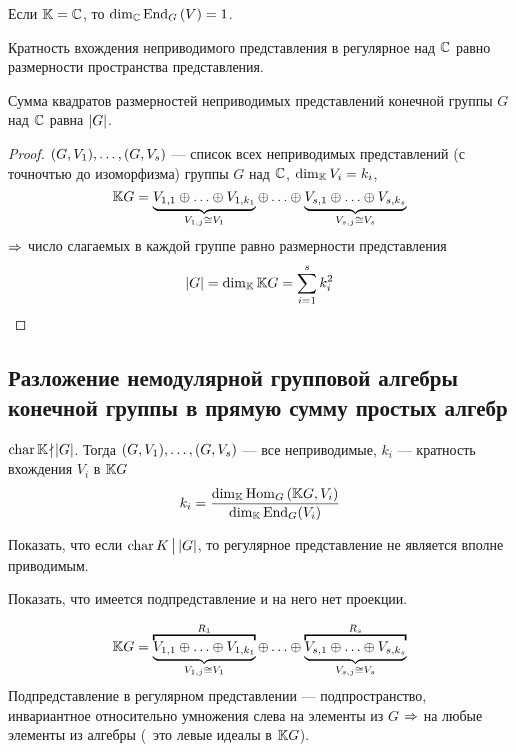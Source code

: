 Если $\mathbb{K} = \mathbb{C}$, то $\dim_{\mathbb{C}} \operatorname{End}_{G} \left(V\right) = 1$.
\begin{stm}
	Кратность вхождения неприводимого представления в регулярное над $\mathbb{C}$
	равно размерности пространства представления.
\end{stm}
\begin{imp}
	Сумма квадратов размерностей неприводимых представлений
	конечной группы $G$ над $\mathbb{C}$ равна $\left|G\right|$.
\end{imp}
\begin{proof}
	$(G, V_1) ,\ldots, (G, V_s)$ --- список всех неприводимых представлений (с точночтью до изоморфизма)
	группы $G$ над $\mathbb{C}$, $\dim_{\mathbb{K}} V_i = k_i$,
	$$
		\K G = \ub{V_{1,1} \sop V_{1,k_1}}_{V_{1, j} \cong V_1} \sop
		\ub{V_{s,1} \sop V_{s,k_s}}_{V_{s, j} \cong V_s}
	$$
	$\Rightarrow$ число слагаемых в каждой группе равно размерности представления
	$$
		\left|G\right| = \dim_{\mathbb{K}} \mathbb{K} G = \sum_{i = 1}^s k_i^2
	$$
\end{proof}


\subsection{Разложение немодулярной групповой алгебры конечной группы в прямую сумму простых алгебр}
$\operatorname{char} \mathbb{K} \!\nmid\! \left|G\right|$.
Тогда $(G, V_1) ,\ldots, (G, V_s)$ --- все неприводимые,
$k_i$ --- кратность вхождения $V_i$ в $\mathbb{K} G$
$$
	k_i = \frac{\dim_{\mathbb{K}}\operatorname{Hom}_G\left(\mathbb{K} G, V_i\right)}{\dim_{\mathbb{K}}\operatorname{End}_G(V_i)}
$$
\begin{problem}
	Показать, что если $\operatorname{char} K \,\bigl\rvert\, \left|G\right|$,
	то регулярное представление не является вполне приводимым.
\end{problem}
\begin{hint}
	Показать, что имеется подпредставление и на него нет проекции.
\end{hint}
\begin{equation}
	\K G = \obt{\ub{V_{1,1} \sop V_{1,k_1}}_{V_{1, j} \cong V_1}}^{R_1} \sop
	\obt{\ub{V_{s,1} \sop V_{s,k_s}}_{V_{s, j} \cong V_s}}^{R_s}
\end{equation}
Подпредставление в регулярном представлении --- подпространство,
инвариантное относительно умножения слева на элементы из $G$ $\Rightarrow$
на любые элементы из алгебры
(\ie\ это левые идеалы в $\mathbb{K} G$).

